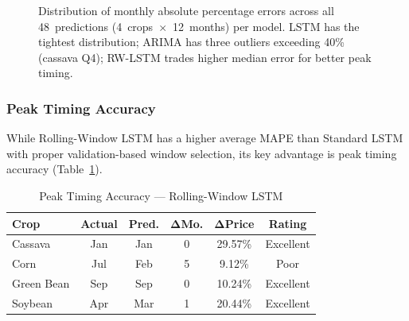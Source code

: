 \documentclass[journal]{IEEEtran}
\begin{document}
\begin{figure}[htbp]
  \caption{Distribution of monthly absolute percentage errors across all 48~predictions (4~crops~$\times$~12~months) per model. LSTM has the tightest distribution; ARIMA has three outliers exceeding 40\% (cassava Q4); RW-LSTM trades higher median error for better peak timing.}
  \label{fig:boxplot}
\end{figure}


\subsubsection{Peak Timing Accuracy}

While Rolling-Window LSTM has a higher average MAPE than Standard LSTM with proper validation-based window selection, its key advantage is peak timing accuracy (Table~\ref{tab:peak}).

\begin{table}[htbp]
  \centering
  \caption{Peak Timing Accuracy --- Rolling-Window LSTM}
  \label{tab:peak}
  \begin{tabular}{lccccc}
    \toprule
    \textbf{Crop} & \textbf{Actual} & \textbf{Pred.} & $\boldsymbol{\Delta}$\textbf{Mo.} & $\boldsymbol{\Delta}$\textbf{Price} & \textbf{Rating} \\
    \midrule
    Cassava    & Jan & Jan & 0 & 29.57\% & Excellent \\
    Corn       & Jul & Feb & 5 & 9.12\%  & Poor \\
    Green Bean & Sep & Sep & 0 & 10.24\% & Excellent \\
    Soybean    & Apr & Mar & 1 & 20.44\% & Excellent \\
    \bottomrule
  \end{tabular}
\end{table}
\end{document}
